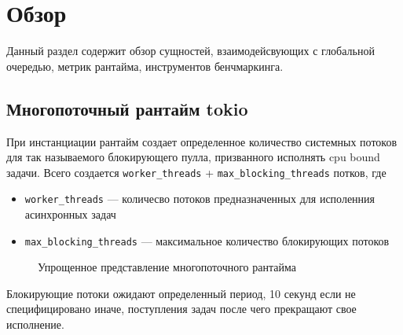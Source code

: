
\section{Обзор}

Данный раздел содержит обзор сущностей, взаимодейсвующих с глобальной очередью, метрик рантайма, инструментов бенчмаркинга.

\subsection{Многопоточный рантайм tokio}

При инстанциации рантайм создает определенное количество системных потоков для так называемого блокирующего пулла, призванного исполнять cpu bound задачи. Всего создается \verb|worker_threads| + \verb|max_blocking_threads| потков, где

\begin{itemize}
    \item \verb|worker_threads| --- количесво потоков предназначенных для исполенния асинхронных задач
    \item \verb|max_blocking_threads| --- максимальное количество блокирующих потоков
\end{itemize}

\begin{figure}[H]
    \begin{center}
    \end{center}

    \caption{Упрощенное представление многопоточного рантайма}
    \label{fig:before}
\end{figure}

Блокирующие потоки ожидают определенный период, 10 секунд если не специфицировано иначе, поступления задач после чего прекращают свое исполнение.

